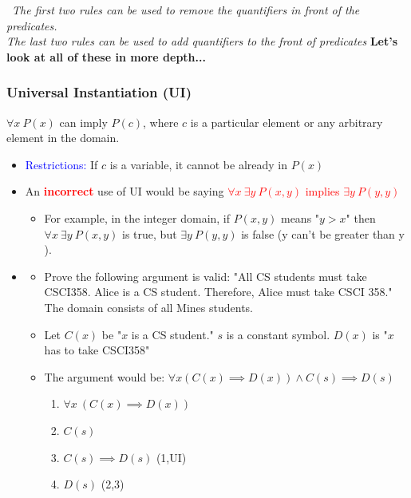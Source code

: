 \documentclass[12pt, letterpaper]{article}
\newcommand{\cul}[1]{%
		\uline{\phantom{#1}}%
		\llap{\contour{white}{#1}}%
	}
\begin{document}
\bigbreak
\faInfoCircle \ \emph{The first two rules can be used to remove the quantifiers in front of the predicates. \\ The last two rules can be used to add quantifiers to the front of predicates}
\bigbreak
\textbf{Let's look at all of these in more depth...}


\pagebreak
\subsubsection*{Universal Instantiation (UI)}
$\forall x \ P(x)$ can imply $P(c)$, where $c$ is a particular element or any arbitrary element in the domain. 
\begin{itemize}[label={}, leftmargin=0.3cm]
	\item \textcolor{blue}{Restrictions:} If $c$ is a variable, it cannot be already in $P(x)$
	\item An \textcolor{red}{\textbf{incorrect}} use of UI would be saying \textcolor{red}{$\forall x \ \exists y \ P(x,y)$ implies $\exists y \ P(y,y)$}
	\begin{itemize}[label={}]
		\item For example, in the integer domain, if $P(x,y)$ means "$ y > x $" then $\forall x \ \exists y \ P(x,y)$ is true, but $\exists y \ P(y,y)$ is false (y can't be greater than y \faSmileO).
	\end{itemize}
	\item \cul{Example}
	\begin{itemize}[label={}]
		\item Prove the following argument is valid: "All CS students must take CSCI358. Alice is a CS student. Therefore, Alice must take CSCI 358." The domain consists of all Mines students.
		\item Let $C(x)$ be "$x$ is a CS student." $s$ is a constant symbol. $D(x)$ is "$x$ has to take CSCI358"
		\item The argument would be: $\forall x (C(x) \implies D(x)) \land C(s) \implies D(s)$
		{\small \begin{enumerate}
			\item $\forall x \ (C(x) \implies D(x))$
			\item $C(s)$
			\item $C(s) \implies D(s)$ (1,UI)
			\item $D(s)$ \hspace*{1.75cm} (2,3)
		\end{enumerate}
		}
	\end{itemize}
\end{itemize}
\end{document}
